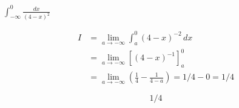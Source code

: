 $\displaystyle \int_{-\infty}^{0} \frac{dx}{(4-x)^2}$

\nopagebreak
\begin{align*}
I &= \lim_{a \to -\infty} \int_{a}^{0} (4-x)^{-2} \, dx \\
&= \lim_{a \to -\infty} \left[ (4-x)^{-1} \right]_{a}^{0} \\
&= \lim_{a \to -\infty} (\frac{1}{4} - \frac{1}{4-a}) = 1/4 - 0 = 1/4
\end{align*}

\[
\boxed{\displaystyle 1/4}
\]
